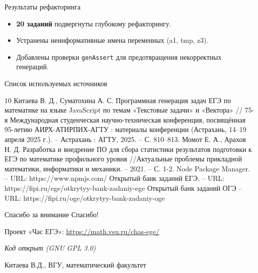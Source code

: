 \documentclass[aspectratio=169,12pt]{beamer}
\begin{document}
\begin{frame}{Результаты рефакторинга}
    \vfill
    \begin{itemize}
        \item \textbf{20 заданий} подвергнуты глубокому рефакторингу.
        \item Устранены неинформативные имена переменных (a1, tmp, z3).
        \item Добавлены проверки \texttt{genAssert} для предотвращения некорректных генераций.
    \end{itemize}
\end{frame}

\begin{frame}{Список используемых источников}
    \fontsize{5pt}{6pt}\selectfont
    \setlength{\bibsep}{0pt}
    \setlength{\parskip}{0pt}
    \setlength{\leftmargin}{0.5em}
    \begin{thebibliography}{10}
        Китаева В. Д., Суматохина А. С. Программная генерация задач ЕГЭ по математике на языке JavaScript по темам «Текстовые задачи» и «Вектора» // 75-я Международная студенческая научно-техническая конференция, посвящённая 95-летию АИРХ-АТИРПИХ-АГТУ : материалы конференции (Астрахань, 14–19 апреля 2025 г.). – Астрахань : АГТУ, 2025. – С. 810–813.
        Момот Е. А., Арахов Н. Д. Разработка и внедрение ПО для сбора статистики результатов подготовки к ЕГЭ по математике профильного уровня //Актуальные проблемы прикладной математики, информатики и механики. – 2021. – С. 1-2.
        Node Package Manager. – URL: https://www.npmjs.com/
        Открытый банк заданий ЕГЭ. – URL: https://fipi.ru/ege/otkrytyy-bank-zadaniy-ege
        Открытый банк заданий ОГЭ – URL:  https://fipi.ru/oge/otkrytyy-bank-zadaniy-oge
    \end{thebibliography}
\end{frame}

\begin{frame}{Спасибо за внимание}
    \centering
    \vfill
    {\Huge Спасибо!}
    \vspace{0.5cm}
    
    \begin{minipage}{0.7\textwidth}
        \centering
        
        \vspace{0.5cm}
        Проект «Час ЕГЭ»: \url{https://math.vsu.ru/chas-ege/}
        
        \vspace{0.2cm}
        \textit{Код открыт (GNU GPL 3.0)}
    \end{minipage}
    \vfill
    \begin{flushright}
        \small Китаева В.Д., ВГУ, математический факультет
    \end{flushright}
\end{frame}
\end{document}

